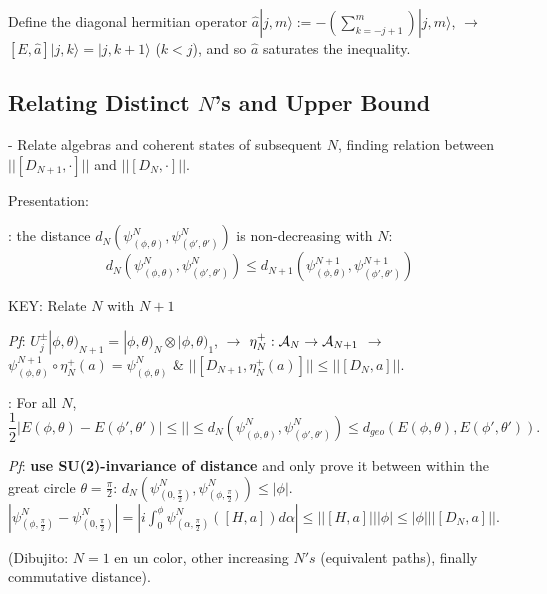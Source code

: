 Define the diagonal hermitian operator $\hat a |j, m\rangle := - \left( \sum_{k = -j+1}^m  \right)|j, m\rangle$, $\longrightarrow$ $[E, \hat a] |j, k \rangle = |j, k+1\rangle$ ($k < j$), and so $\hat a$ saturates the inequality.

\linea
\subsection{Relating Distinct $N$'s and Upper Bound}

 - Relate algebras and coherent states of subsequent $N$, finding relation between $||[D_{N+1}, \cdot]||$ and $||[D_N, \cdot]||$.
 
Presentation:

: the distance $d_N(\psi^N_{(\phi, \theta)}, \psi^N_{(\phi', \theta')})$ is non-decreasing with $N$:
\begin{equation}
    d_N(\psi^N_{(\phi, \theta)}, \psi^N_{(\phi', \theta')}) \leq d_{N+1}(\psi^{N+1}_{(\phi, \theta)}, \psi^{N+1}_{(\phi', \theta')})
\end{equation}

 KEY: Relate $N$ with $N+1$
 
\textit{Pf}: $U^\pm_j |\phi, \theta)_{N+1} = |\phi, \theta)_N \otimes |\phi, \theta)_1$, $\xrightarrow{}$ $\eta^+_N: \mathcal A_N \to \mathcal A_{N + 1}$ $\longrightarrow{}$ $\psi^{N+1}_{(\phi, \theta)} \circ \eta^+_N(a) = \psi^N_{(\phi, \theta)}$ \& $||[D_{N + 1}, \eta^+_N(a)]|| \leq ||[D_N, a]||$.

: For all $N$, 
\begin{equation}
    \frac{1}{2}|E(\phi, \theta)- E(\phi', \theta')| \leq || \leq d_N(\psi^N_{(\phi, \theta)}, \psi^N_{(\phi', \theta')}) \leq d_{geo}(E(\phi, \theta), E(\phi', \theta')).
\end{equation}

\textit{Pf}: \textbf{use SU(2)-invariance of distance} and only prove it between within the great circle $\theta = \frac{\pi}{2}$: $d_N(\psi^N_{(0, \frac{\pi}{2})}, \psi^N_{(\phi, \frac{\pi}{2})}) \leq |\phi|$. 
$|\psi^N_{(\phi, \frac{\pi}{2})} - \psi^N_{(0, \frac{\pi}{2})}| = |i \int_0^\phi \psi^N_{(\alpha, \frac{\pi}{2})}([H, a]) d\alpha | \leq ||[H, a]|| |\phi| \leq |\phi| ||[D_N, a]||$.

(Dibujito: $N=1$ en un color, other increasing $N's$ (equivalent paths), finally commutative distance).

\linea

